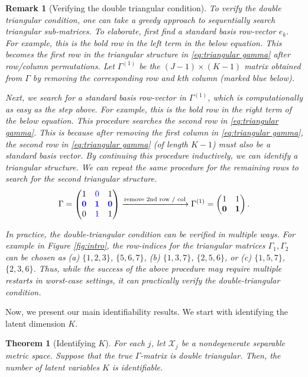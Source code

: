 \documentclass[10pt]{article} %
\newtheorem{theorem}{Theorem}
\newtheorem{remark}{Remark}
\begin{document}
\begin{remark}[{Verifying the double triangular condition}]
    To verify the double triangular condition, one can take a greedy approach to sequentially search triangular sub-matrices. To elaborate, first find a standard basis row-vector $e_k$. For example, this is the bold row in the left term in the below equation. This becomes the first row in the triangular structure in \eqref{eq:triangular gamma} after row/column permutations. Let $\Gamma^{(1)}$ be the $(J-1) \times (K-1)$ matrix obtained from $\Gamma$ by removing the corresponding row and $k$th column (marked blue below).

    Next, we search for a standard basis row-vector in $\Gamma^{(1)}$, which is computationally as easy as the step above. For example, this is the bold row in the right term of the below equation. This procedure searches the second row in \eqref{eq:triangular gamma}. This is because after removing the first column in \eqref{eq:triangular gamma}, the second row in \eqref{eq:triangular gamma} (of length $K-1$) must also be a standard basis vector. By continuing this procedure inductively, we can identify a triangular structure. We can repeat the same procedure for the remaining rows to search for the second triangular structure. 
    $$\Gamma = \begin{pmatrix} 1 & {\color{blue} 0} & 1 \\ \textbf{\color{blue} 0} & \textbf{\color{blue} 1} & \textbf{\color{blue} 0} \\ 0 & {\color{blue} 1} & 1 \end{pmatrix} \xrightarrow{\text{remove 2nd row / col}} \Gamma^{(1)} = \begin{pmatrix} {1} & 1 \\ \textbf{0} & \textbf{1} \end{pmatrix}.$$

In practice, the double-triangular condition can be verified in multiple ways. For example in Figure \ref{fig:intro}, the row-indices for the triangular matrices $\Gamma_1,\Gamma_2$ can be chosen as (a) $\{1,2,3\}$, $\{5,6,7\}$, (b) $\{1,3,7\}$, $\{2,5,6\}$, or (c) $\{1,5,7\}$, $\{2,3,6\}$. Thus, while the success of the above procedure may require multiple restarts in worst-case settings, it can practically verify the double-triangular condition. %
\end{remark}

%

Now, we present our main identifiability results. We start with identifying the latent dimension $K$.
\begin{theorem}[Identifying $K$]\label{thm:identify K}
    For each $j$, let $\mathcal{X}_j$ be a nondegenerate separable metric space. Suppose that the true $\Gamma$-matrix is double triangular. Then, the number of latent variables $K$ is identifiable.
\end{theorem}
\end{document}
